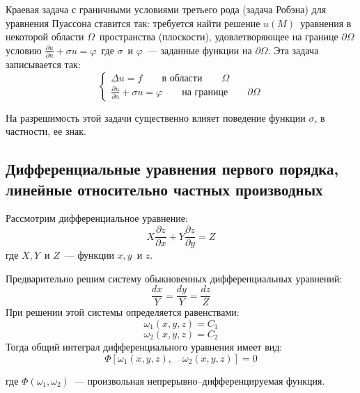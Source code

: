 Краевая задача с граничными условиями третьего рода (задача Робэна) для
уравнения Пуассона ставится так: требуется найти решение $u(M)$\, уравнения
в некоторой области $\Omega$\, пространства (плоскости), удовлетворяющее на
границе $\partial\Omega$\, условию
$\frac{\partial u}{\partial n} + \sigma u = \varphi$\, где $\sigma$\, и
$\varphi$\, --- заданные функции на $\partial\Omega$. Эта задача
записывается так:
\begin{equation*}
\begin{cases}
\Delta u  = f \qquad \text{в области}\qquad \Omega\\
\frac{\partial u}{\partial n} + \sigma u = \varphi\qquad
\text{на границе}\qquad \partial\Omega
\end{cases}
\end{equation*}


На разрешимость этой задачи существенно влияет поведение функции $\sigma$,
в частности, ее знак.

\subsection{Дифференциальные уравнения первого порядка, линейные
относительно частных производных}

Рассмотрим дифференциальное уравнение: 
\begin{equation}\label{pde02}
X \frac{\partial z}{\partial x} + Y \frac{\partial z}{\partial y} = Z
\end{equation}
где $X, Y$\, и $Z$\, --- функции $x, y$\, и $z$.

Предварительно решим систему обыкновенных дифференциальных уравнений:
$$
\frac{dx}{Y}=\frac{dy}{Y}=\frac{dz}{Z}
$$
При решении этой системы определяется равенствами:
$$
\omega_1(x, y, z) = C_1
$$
$$
\omega_2(x, y, z) = C_2
$$
Тогда общий интеграл дифференциального уравнения 
имеет вид:
$$
\Phi \left[ \omega_1(x, y, z), \quad \omega_2(x, y, z)\right] =0
$$


где $\Phi(\omega_1, \omega_2)$\, --- произвольная
непрерывно--дифференцируемая функция.
